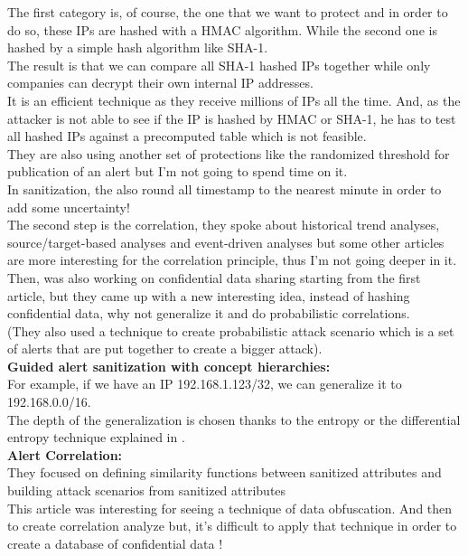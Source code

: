 \documentclass{eplmastersthesis}
\begin{document}
The first category is, of course, the one that we want to protect and in order to do so, these IPs are hashed with a HMAC algorithm. While the second one is hashed by a simple hash algorithm like SHA-1.\\
The result is that we can compare all SHA-1 hashed IPs together while only companies can decrypt their own internal IP addresses.\\
It is an efficient technique as they receive millions of IPs all the time. And, as the attacker is not able to see if the IP is hashed by HMAC or SHA-1, he has to test all hashed IPs against a precomputed table which is not feasible.\\
They are also using another set of protections like the randomized threshold for publication of an alert but I'm not going to spend time on it.\\
In sanitization, the also round all timestamp to the nearest minute in order to add some uncertainty!\\
The second step is the correlation, they spoke about historical trend analyses, source/target-based analyses and event-driven analyses but some other articles are more interesting for the correlation principle, thus I'm not going deeper in it.\\

Then, \cite{xu2005privacy} was also working on confidential data sharing starting from the first article, but they came up with a new interesting idea, instead of hashing confidential data, why not generalize it and do probabilistic correlations.\\
(They also used a technique to create probabilistic attack scenario which is a set of alerts that are put together to create a bigger attack).\\
\textbf{Guided alert sanitization with concept hierarchies:}\\
For example, if we have an IP 192.168.1.123/32, we can generalize it to 192.168.0.0/16.\\
The depth of the generalization is chosen thanks to the entropy or the differential entropy technique explained in \cite{cover1991elements}.
\\
\textbf{Alert Correlation:}\\
They focused on defining similarity functions between sanitized attributes and building attack scenarios from sanitized attributes
\\

This article was interesting for seeing a technique of data obfuscation. And then to create correlation analyze but, it's difficult to apply that technique in order to create a database of confidential data !
\\
\end{document}

